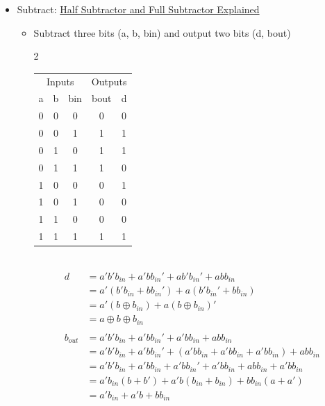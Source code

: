 \documentclass[main.tex]{subfiles}
\begin{document}
\begin{enumerate}
\begin{itemize}
        \item Subtract: \href{https://www.youtube.com/watch?v=lqN8xLTtdaA&t=449s}{Half Subtractor and Full Subtractor Explained}
        \begin{itemize}
            \item Subtract three bits (a, b, bin) and output two bits (d, bout)
        \begin{multicols}{2}
            \begin{tabular}{ccc|cc}
                \multicolumn{3}{c|}{Inputs} & \multicolumn{2}{c}{Outputs} \\
                 a & b & bin & bout & d \\\hline
                 0 & 0 & 0 & 0 & 0 \\
                 0 & 0 & 1 & 1 & 1 \\
                 0 & 1 & 0 & 1 & 1 \\
                 0 & 1 & 1 & 1 & 0 \\
                 1 & 0 & 0 & 0 & 1 \\
                 1 & 0 & 1 & 0 & 0 \\
                 1 & 1 & 0 & 0 & 0 \\
                 1 & 1 & 1 & 1 & 1 \\
            \end{tabular}
            \\
            \begin{align*}
                d &= a'b'b_{in}+a'bb_{in}'+ab'b_{in}'+abb_{in} \\
                &= a'(b'b_{in}+bb_{in}')+a(b'b_{in}'+bb_{in}) \\
                &= a'(b\oplus b_{in})+a(b\oplus b_{in})' \\
                &= a \oplus b \oplus b_{in} \\
                \\
                b_{out} &= a'b'b_{in} + a'bb_{in}' + a'bb_{in} + abb_{in} \\
                &= a'b'b_{in} + a'bb_{in}' + (a'bb_{in} + a'bb_{in} + a'bb_{in}) + abb_{in} \\
                &= a'b'b_{in} + a'bb_{in}+ a'bb_{in}' + a'bb_{in} + abb_{in} + a'bb_{in}\\
                &= a'b_{in}(b+b') + a'b(b_{in} + b_{in}) + bb_{in}(a+a') \\
                &= a'b_{in} + a'b + bb_{in}
            \end{align*}
        \end{multicols}
        

\end{itemize}
\end{itemize}
\end{enumerate}
\end{document}
